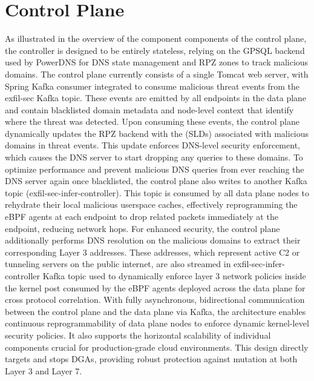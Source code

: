 \documentclass [11pt, proquest] {uwthesis}[2020/02/24]
\begin{document}
\section{Control Plane}
As illustrated in the overview of the component components of the control plane, the controller is designed to be entirely stateless, relying on the GPSQL backend used by PowerDNS for DNS state management and RPZ zones to track malicious domains. The control plane currently consists of a single Tomcat web server, with Spring Kafka consumer integrated to consume malicious threat events from the exfil-sec Kafka topic. These events are emitted by all endpoints in the data plane and contain blacklisted domain metadata and node-level context that identify where the threat was detected. Upon consuming these events, the control plane dynamically updates the RPZ backend with the (SLDs) associated with malicious domains in threat events. This update enforces DNS-level security enforcement, which causes the DNS server to start dropping any queries to these domains. To optimize performance and prevent malicious DNS queries from ever reaching the DNS server again once blacklisted, the control plane also writes to another Kafka topic (exfil-sec-infer-controller). This topic is consumed by all data plane nodes to rehydrate their local malicious userspace caches, effectively reprogramming the eBPF agents at each endpoint to drop related packets immediately at the endpoint, reducing network hops. For enhanced security, the control plane additionally performs DNS resolution on the malicious domains to extract their corresponding Layer 3 addresses. These addresses, which  represent active C2 or tunneling servers on the public internet, are also streamed in exfil-sec-infer-controller Kafka topic used to dynamically enforce layer 3 network policies inside the kernel post consumed by the eBPF agents deployed across the data plane for cross protocol correlation. With fully asynchronous, bidirectional communication between the control plane and the data plane via Kafka, the architecture enables continuous reprogrammability of data plane nodes to enforce dynamic kernel-level security policies. It also supports the horizontal scalability of individual components crucial for production-grade cloud environments. This design directly targets and stops DGAs, providing robust protection against mutation at both Layer 3 and Layer 7.
\end{document}
